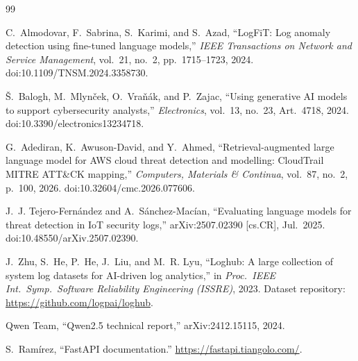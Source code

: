 \documentclass[12pt,a4paper]{report}
\begin{document}
\begin{thebibliography}{99}

C.~Almodovar, F.~Sabrina, S.~Karimi, and S.~Azad, ``LogFiT: Log anomaly detection using fine-tuned language models,'' \emph{IEEE Transactions on Network and Service Management}, vol.~21, no.~2, pp.~1715--1723, 2024. doi:10.1109/TNSM.2024.3358730.

\v{S}.~Balogh, M.~Mlyn\v{c}ek, O.~Vra\v{n}\'ak, and P.~Zajac, ``Using generative AI models to support cybersecurity analysts,'' \emph{Electronics}, vol.~13, no.~23, Art.~4718, 2024. doi:10.3390/electronics13234718.

G.~Adediran, K.~Awuson-David, and Y.~Ahmed, ``Retrieval-augmented large language model for AWS cloud threat detection and modelling: CloudTrail MITRE ATT\&CK mapping,'' \emph{Computers, Materials \& Continua}, vol.~87, no.~2, p.~100, 2026. doi:10.32604/cmc.2026.077606.

J.~J. Tejero-Fern\'andez and A.~S\'anchez-Mac\'ian, ``Evaluating language models for threat detection in IoT security logs,'' arXiv:2507.02390 [cs.CR], Jul.\ 2025. doi:10.48550/arXiv.2507.02390.

J.~Zhu, S.~He, P.~He, J.~Liu, and M.~R. Lyu, ``Loghub: A large collection of system log datasets for AI-driven log analytics,'' in \emph{Proc.\ IEEE Int.\ Symp.\ Software Reliability Engineering (ISSRE)}, 2023. %
Dataset repository: \url{https://github.com/logpai/loghub}.

Qwen Team, ``Qwen2.5 technical report,'' arXiv:2412.15115, 2024.

S.~Ram\'irez, ``FastAPI documentation.'' \url{https://fastapi.tiangolo.com/}. %

\end{thebibliography}
\end{document}
